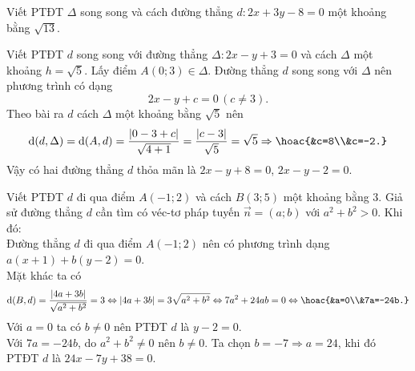 	\begin{bt}%
		Viết PTĐT $\Delta$ song song và cách đường thẳng $d\colon 2x+3y-8=0$ một khoảng bằng $\sqrt{13}$.
	\end{bt}
	\begin{bt}%
		Viết PTĐT $d$ song song với đường thẳng $\Delta\colon 2x-y+3=0$ và cách $\Delta$ một khoảng $h=\sqrt{5}$.
		\loigiai
		{Lấy điểm $A(0;3)\in \Delta$. Đường thẳng $d$ song song với $\Delta$ nên phương trình có dạng
			$$2x-y+c=0 \, (c\neq 3).$$
			Theo bài ra $d$ cách $\Delta$ một khoảng bằng $\sqrt{5}$ nên
			$$\mathrm{d}(d,\Delta)=\mathrm{d}(A,d)=\dfrac{\left|0-3+c\right|}{\sqrt{4+1}}=\dfrac{\left|c-3\right|}{\sqrt{5}}=\sqrt{5} \Rightarrow \hoac{&c=8\\&c=-2.}$$
			Vậy có hai đường thẳng $d$ thỏa mãn là $2x-y+8=0$, $2x-y-2=0$.}
	\end{bt}
	\begin{bt}%
		Viết PTĐT $d$ đi qua điểm $A(-1;2)$ và cách $B(3;5)$ một khoảng bằng $3$.
		\loigiai
		{Giả sử đường thẳng $d$ cần tìm có véc-tơ pháp tuyến $\overrightarrow{n}=(a;b)$ với $a^2+b^2>0$. Khi đó:\\
			Đường thẳng $d$ đi qua điểm $A(-1;2)$ nên có phương trình dạng $a(x+1)+b(y-2)=0$.\\
			Mặt khác ta có 
			$$\mathrm{d}(B,d)=\dfrac{\left|4a+3b\right|}{\sqrt{a^2+b^2}}=3 \Leftrightarrow |4a+3b|=3\sqrt{a^2+b^2} \Leftrightarrow 7a^2+24ab=0 \Leftrightarrow \hoac{&a=0\\&7a=-24b.}$$
			Với $a=0$ ta có $b\neq 0$ nên PTĐT $d$ là $y-2=0$.\\
			Với $7a=-24b$, do $a^2+b^2\neq 0$ nên $b\neq 0$. Ta chọn $b=-7 \Rightarrow a=24$, khi đó PTĐT $d$ là $24x-7y+38=0$.}
	\end{bt}
